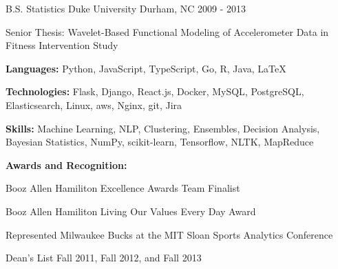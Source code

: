 \documentclass[11pt, a4paper]{awesome-cv}
\begin{document}
\makecvheader

\begin{cventries}
  \vspace{.5 mm}
  \cventry
    {B.S. Statistics}
    {Duke University}
    {Durham, NC}
    {2009 - 2013}
    {
      \begin{cvitems}
        \item{Senior Thesis: Wavelet-Based Functional Modeling of Accelerometer Data
        in Fitness Intervention Study}
      \end{cvitems}
    }
\end{cventries}

\begin{cventries}
  \cventry
    {}
    {}
    {}
    {}
    {
      \begin{cvitems}
        \item{\textbf{Languages:} Python, JavaScript, TypeScript, Go, R, Java, \LaTeX}
        \item{\textbf{Technologies:} Flask, Django, React.js, Docker, MySQL, PostgreSQL, Elasticsearch, Linux, aws, Nginx, git, Jira}
        \item{\textbf{Skills:} Machine Learning, NLP, Clustering, Ensembles, Decision Analysis, Bayesian Statistics, NumPy, scikit-learn, Tensorflow, NLTK, MapReduce}
        \item{
          \textbf{Awards and Recognition:}
          \\
          \vspace{0.05in}
          \begin{cvitems}
            \item{Booz Allen Hamiliton Excellence Awards Team Finalist}
            \item{Booz Allen Hamiliton Living Our Values Every Day Award}
            \item{Represented Milwaukee Bucks at the MIT Sloan Sports Analytics Conference}
            \item{Dean’s List Fall 2011, Fall 2012, and Fall 2013}
          \end{cvitems}
        }
      \end{cvitems}
    }
\end{cventries}
\end{document}
